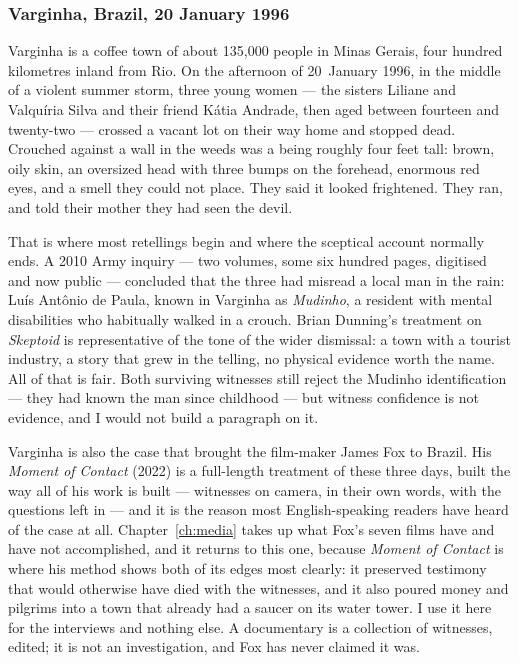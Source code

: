 \subsubsection*{Varginha, Brazil, 20 January 1996}

Varginha is a coffee town of about 135,000 people in Minas Gerais, four hundred kilometres
inland from Rio. On the afternoon of 20~January 1996, in the middle of a violent summer
storm, three young women --- the sisters Liliane and Valqu\'iria Silva and their friend
K\'atia Andrade, then aged between fourteen and twenty-two --- crossed a vacant lot on
their way home and stopped dead. Crouched against a wall in the weeds was a being roughly
four feet tall: brown, oily skin, an oversized head with three bumps on the forehead,
enormous red eyes, and a smell they could not place. They said it looked frightened. They
ran, and told their mother they had seen the devil.

That is where most retellings begin and where the sceptical account normally ends. A 2010
Army inquiry --- two volumes, some six hundred pages, digitised and now public --- concluded
that the three had misread a local man in the rain: Lu\'is Ant\^onio de Paula, known in
Varginha as \emph{Mudinho}, a resident with mental disabilities who habitually walked in a
crouch. Brian Dunning's treatment on \emph{Skeptoid} is representative of the tone of the
wider dismissal: a town with a tourist industry, a story that grew in the telling, no
physical evidence worth the name. All of that is fair. Both surviving witnesses still
reject the Mudinho identification --- they had known the man since childhood --- but witness
confidence is not evidence, and I would not build a paragraph on it.

Varginha is also the case that brought the film-maker James Fox to Brazil. His
\emph{Moment of Contact} (2022) is a full-length treatment of these three days, built the way
all of his work is built --- witnesses on camera, in their own words, with the questions left
in --- and it is the reason most English-speaking readers have heard of the case at all.
Chapter~\ref{ch:media} takes up what Fox's seven films have and have not accomplished, and it
returns to this one, because \emph{Moment of Contact} is where his method shows both of its
edges most clearly: it preserved testimony that would otherwise have died with the witnesses,
and it also poured money and pilgrims into a town that already had a saucer on its water
tower. I use it here for the interviews and nothing else. A documentary is a collection of
witnesses, edited; it is not an investigation, and Fox has never claimed it was.

